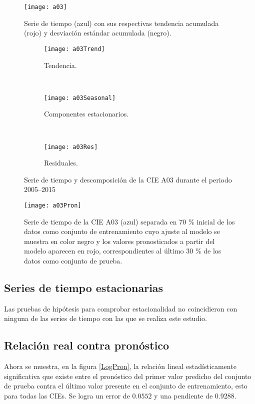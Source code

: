 \documentclass[final,5p,times,twocolumn]{elsarticle}
\begin{document}
\begin{figure*}
  \texttt{[image: a03]}
\caption{Serie de tiempo (azul) con sus respectivas tendencia acumulada (rojo) y desviación estándar acumulada (negro).}
\label{a03} 
\end{figure*}
\begin{figure*}
\centering
\begin{subfigure}{\textwidth}
  \texttt{[image: a03Trend]}
\caption{Tendencia.}
\label{a03Trend}  
\end{subfigure}  
\\
\begin{subfigure}{\textwidth}
  \texttt{[image: a03Seasonal]}
\caption{Componentes estacionarios.}
\label{a03Seasonal}  
\end{subfigure}  
\\
\begin{subfigure}{\textwidth}
  \texttt{[image: a03Res]}
\caption{Residuales.}
\label{a03Res}  
\end{subfigure}
\caption{Serie de tiempo y descomposición de la CIE A03 durante el periodo 2005--2015}
\label{a03All}
\end{figure*}

\begin{figure*}
  \texttt{[image: a03Pron]}
  \caption{Serie de tiempo de la CIE A03 (azul) separada en 70 \% inicial de los datos como conjunto de entrenamiento cuyo ajuste al modelo se muestra en color negro y los valores pronosticados a partir del modelo aparecen en rojo, correspondientes al último 30 \% de los datos como conjunto de prueba.}
  \label{a03Pron}
\end{figure*}

\subsection{Series de tiempo estacionarias}
Las pruebas de hipótesis para comprobar estacionalidad no coincidieron con ninguna de las series de tiempo con las que se realiza este estudio.

\subsection{Relación real contra pronóstico}

Ahora se muestra, en la figura \ref{LogPron}, la relación lineal estadísticamente significativa que existe entre el pronóstico del primer valor predicho del conjunto de prueba contra el último valor presente en el conjunto de entrenamiento, esto para todas las CIEs. Se logra un error de $0.0552$ y una pendiente de $0.9288$.
\end{document}
